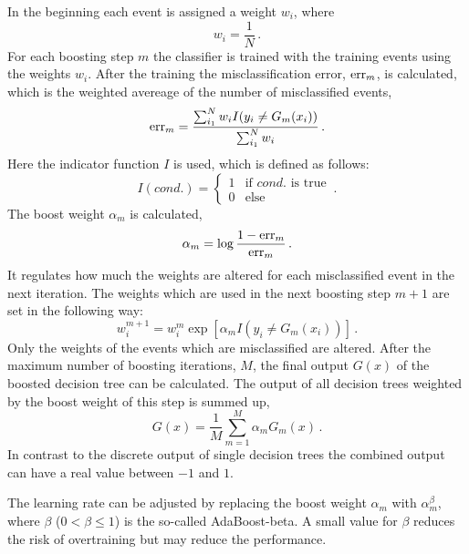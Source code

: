 In the beginning each event is assigned a weight $w_i$, where
\begin{equation}
    w_i = \frac{1}{N} \,.
\end{equation}
For each boosting step $m$ the classifier is trained with the training events using the weights $w_i$.
After the training the misclassification error, $\operatorname{err}_m$, is calculated, which is the weighted avereage of the number of misclassified events,
\begin{equation}
    \operatorname{err}_m = \frac{\sum_{i_1}^N w_i I(y_i \neq G_m(x_i))}{\sum_{i_1}^N w_i} \,.
\end{equation}
Here the indicator function $I$ is used, which is defined as follows:
\begin{equation}
    I(cond.) =
    \begin{cases}
        1 & \text{if $cond.$ is true} \\
        0 & \text{else}
    \end{cases} \,.
\end{equation}
The boost weight $\alpha_m$ is calculated,
\begin{equation}
    \alpha_m = \log \frac{1 - \operatorname{err}_m}{\operatorname{err}_m} \,.
\end{equation}
It regulates how much the weights are altered for each misclassified event in the next iteration.
The weights which are used in the next boosting step $m+1$ are set in the following way:
\begin{equation}
    w_i^{m+1} = w_i^{m} \exp \left[ \alpha_m I \left(y_i \neq G_m(x_i)\right) \right] \,.
\end{equation}
Only the weights of the events which are misclassified are altered.
After the maximum number of boosting iterations, $M$, the final output $G(x)$ of the boosted decision tree
can be calculated.
The output of all decision trees weighted by the boost weight of this step is summed up,
\begin{equation}
    \label{eq:bdts:output_ada}
    G(x) = \frac{1}{M} \sum_{m=1}^M  \alpha_m G_m(x) \,.
\end{equation}
In contrast to the discrete output of single decision trees the combined output can have a real value between $-1$ and $1$.

The learning rate can be adjusted by replacing the boost weight $\alpha_m$ with $\alpha_m^\beta$, where
$\beta$ ($0 < \beta \leq 1$) is the so-called AdaBoost-beta.
A small value for $\beta$ reduces the risk of overtraining but may reduce the performance.

